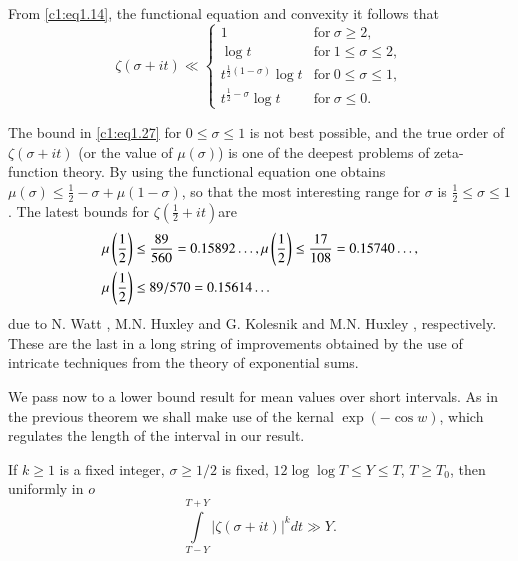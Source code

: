 From \eqref{c1:eq1.14}, the functional equation and convexity it
follows that
\begin{equation}
\zeta (\sigma + it ) \ll
\begin{cases}
  1 & \text{for}~ \sigma \geq 2,\\
  \log t & \text{for} ~1 \leq \sigma \leq 2,\\
  t^{\frac{1}{2}(1- \sigma)} \log t & \text{for}~ 0 \leq \sigma \leq
  1,\\
  t^{\frac{1}{2} - \sigma} \log t & \text{for}~ \sigma \leq 0.
\end{cases}\label{c1:eq1.27}
\end{equation}

The bound in \eqref{c1:eq1.27} for $0 \leq \sigma \leq 1$ is not best
possible, and the true order of $\zeta (\sigma + it )$ (or the
value of $\mu(\sigma)$) is one of the deepest problems of
zeta-function theory. By using the functional equation one obtains
$\mu(\sigma) \leq \frac{1}{2} - \sigma + \mu (1- \sigma)$, so that the
most interesting range for $\sigma$ is $\frac{1}{2} \leq \sigma \leq
1$. The latest bounds for $\zeta (\frac{1}{2}+
it )$\pageoriginale are
\begin{align}
\mu \left(\frac{1}{2}\right) & \leq \frac{89}{560}  = 0.15892 \ldots ,
\mu \left(\frac{1}{2}\right) \leq \frac{17}{108} =
0.15740\ldots,\label{c1:eq1.28} \\
\mu \left( \frac{1}{2}\right) & \leq 89/570 =
0.15614\ldots\notag
\end{align}
due to N. Watt \cite{Watt1}, M.N. Huxley and G. Kolesnik \cite{Huxley and Kolesnik1} and 
M.N. Huxley \cite{Huxley4}, respectively. These are the last in a long
string of improvements obtained by the use of intricate techniques
from the theory of exponential sums.

We pass now to a lower bound result for mean values over short
intervals. As in the previous theorem we shall make use of the kernal
$\exp (- \cos w)$, which regulates the length of the interval in our
result.

\begin{thm}\label{c1:thm1.4}
  If $k \geq 1$ is a fixed integer, $\sigma \geq 1/2$ is fixed, $12
  \log \log T \leq Y \leq T$, $T \geq T_0$, then uniformly in $o$
  \begin{equation}
    \int\limits_{T-Y}^{T+Y} |\zeta (\sigma + it )|^k dt \gg
    Y.  \label{c1:eq1.29} 
  \end{equation}
\end{thm}

